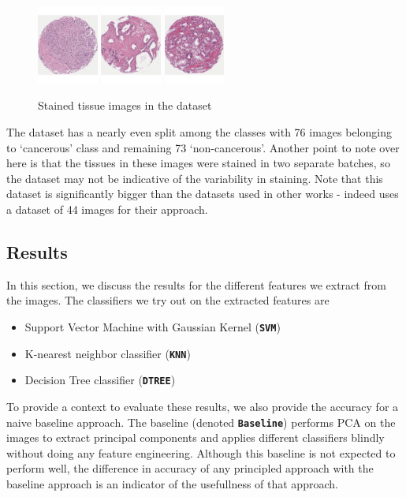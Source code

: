 \begin{figure}
\includegraphics[width=2.0cm]{figs/41_red.pdf}
\includegraphics[width=2.0cm]{figs/108_green.pdf}
\includegraphics[width=2.0cm]{figs/109_red.pdf}
\caption{Stained tissue images in the dataset}
\label{fig:TissueImageExample}

\end{figure}  
  

The dataset has a nearly even split among the classes with 76 images belonging to `cancerous' class and remaining 73 `non-cancerous'. Another point to note over here is that the tissues in these images were stained in two separate batches, so the dataset may not be indicative of the variability in staining. Note that this dataset is significantly bigger than the datasets used in other works - indeed \cite{naik2007gland} uses a dataset of 44 images for their approach.


\subsection{Results}
In this section, we discuss the results for the different features we extract from the images. The classifiers we try out on the extracted features are 
\begin{itemize}
\item Support Vector Machine with Gaussian Kernel (\textbf{\texttt{SVM}})
\item K-nearest neighbor classifier (\textbf{\texttt{KNN}})
\item Decision Tree classifier (\textbf{\texttt{DTREE}})
\end{itemize}

To provide a context to evaluate these results, we also provide the accuracy for a naive baseline approach. The baseline (denoted \textbf{\texttt{Baseline}}) performs PCA on the images to extract principal components and applies different classifiers blindly without doing any feature engineering. Although this baseline is not expected to perform well, the difference in accuracy of any principled approach with the baseline approach is an indicator of the usefullness of that approach.

